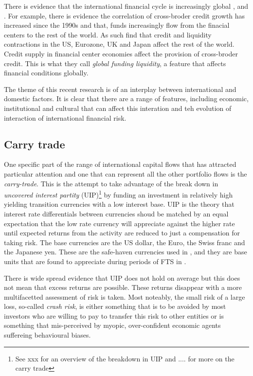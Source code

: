 \documentclass[12pt, a4paper, oneside]{article} %
\begin{document}
There is evidence that the international financial cycle is increasingly global \citet{Rey2013}, \citep{Obstfeld2013} and \citet{Bruno2013}.  %
For example, there is evidence the correlation of cross-broder credit growth has increased since the 1990s and that, funds increasingly flow from the finacial centers to the rest of the world. As such \citet{Cerutti2014} find that credit and liquidity contractions in  the US, Eurozone, UK and Japan affect the rest of the world. Credit supply in financial center economies affect the provision of cross-broder credit.  This is what they call \emph{global funding liquidity}, a feature that affects financial conditions globally. 

The theme of this recent research is of an interplay between international and domestic factors.  It is clear that there are a range of features, 
including economic, institutional and cultural that can affect this interation and teh evolution of interaction of international financial risk. 

\subsection{Carry trade}
One specific part of the range of international capital flows that has attracted particular attention and one  that can represent all the other portfolio flows is the \emph{carry-trade}.  This is the attempt to take advantage of the break down in \emph{uncovered interest partity} (UIP)\footnote{See xxx for an overview of the breakdown in UIP and .... for more on the carry trade} by funding an investment in relatively high yielding transition currencies with a low interest base.  UIP is the theory that interest rate differentials between currencies shoud be matched by an equal expectation that the low rate currency will appreciate against the higher rate until expected returns from the activity are reduced to just a compensation for taking risk. The base currencies are the US dollar, the Euro, the Swiss franc and the Japanese yen.  These are the safe-haven currencies used in \citet{HabibStracca}, and they are base units that are found to appreciate during periods of FTS in \citet{FTS}. 

There is wide spread evidence that UIP does not hold on average but this does not mean that excess returns are possible.  These returns disappear with a more multifacetted assessment of risk is taken.  Most noteably, the small risk of a large loss, so-called \emph{crash risk}, is either something that is to be avoided by most investors who are willing to pay to transfer this risk to other entities or is something that mis-perceived by myopic, over-confident economic agents suffereing behavioural biases.  
\end{document}
